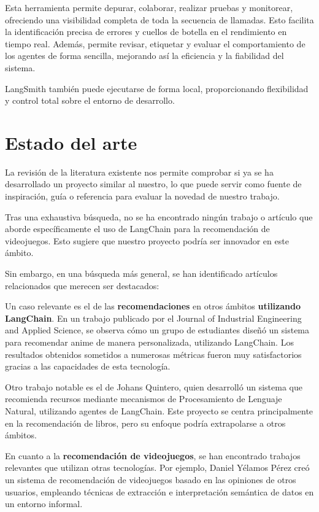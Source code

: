 Esta herramienta permite depurar, colaborar, realizar pruebas y monitorear, ofreciendo una visibilidad completa de toda la secuencia de llamadas. Esto facilita la identificación precisa de errores y cuellos de botella en el rendimiento en tiempo real. Además, permite revisar, etiquetar y evaluar el comportamiento de los agentes de forma sencilla, mejorando así la eficiencia y la fiabilidad del sistema.  

LangSmith también puede ejecutarse de forma local, proporcionando flexibilidad y control total sobre el entorno de desarrollo.  \cite{PaginaLangChainOficialLangSmith}

\newpage
\section{Estado del arte}

La revisión de la literatura existente nos permite comprobar si ya se ha desarrollado un proyecto similar al nuestro, lo que puede servir como fuente de inspiración, guía o referencia para evaluar la novedad de nuestro trabajo.

Tras una exhaustiva búsqueda, no se ha encontrado ningún trabajo o artículo que aborde específicamente el uso de LangChain para la recomendación de videojuegos. Esto sugiere que nuestro proyecto podría ser innovador en este ámbito.

Sin embargo, en una búsqueda más general, se han identificado artículos relacionados que merecen ser destacados:

Un caso relevante es el de las \textbf{recomendaciones} en otros ámbitos \textbf{utilizando LangChain}. En un trabajo publicado por el Journal of Industrial Engineering and Applied Science, se observa cómo un grupo de estudiantes diseñó un sistema para recomendar anime de manera personalizada, utilizando LangChain. Los resultados obtenidos sometidos a numerosas métricas fueron muy satisfactorios gracias a las capacidades de esta tecnología. \cite{LangChainAnime}

Otro trabajo notable es el de Johans Quintero, quien desarrolló un sistema que recomienda recursos mediante mecanismos de Procesamiento de Lenguaje Natural, utilizando agentes de LangChain. Este proyecto se centra principalmente en la recomendación de libros, pero su enfoque podría extrapolarse a otros ámbitos. \cite{recommender-agent-langchain}

En cuanto a la \textbf{recomendación de videojuegos}, se han encontrado trabajos relevantes que utilizan otras tecnologías. Por ejemplo, Daniel Yélamos Pérez creó un sistema de recomendación de videojuegos basado en las opiniones de otros usuarios, empleando técnicas de extracción e interpretación semántica de datos en un entorno informal. \cite{recomendacion-videojuegos-uam}

